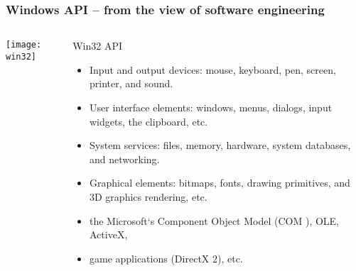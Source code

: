 \begin{frame}[plain]
	\frametitle{Windows API -- from the view of software engineering}
	
	
	
	\begin{columns}
		
		\begin{column}{.4\textwidth}
			
			\texttt{[image: win32]}
			
		\end{column}
		
		\begin{column}{.6\textwidth}
			
			Win32 API
			
			\begin{itemize}
				\item Input and output devices: mouse, keyboard, pen, screen,
				printer, and sound.
				
				\item User interface elements: windows, menus, dialogs, input
				widgets, the clipboard, etc.
				
				\item System services: files, memory, hardware, system
				databases, and networking.
				
				\item Graphical elements: bitmaps, fonts, drawing primitives, and 3D graphics rendering, etc.
				
				\item the Microsoft‘s Component Object Model (COM ), OLE, ActiveX,
				
				\item game applications (DirectX 2), etc.
				
				
			\end{itemize}
			
			
		\end{column}
		
		
	\end{columns}
	
	
\end{frame}

